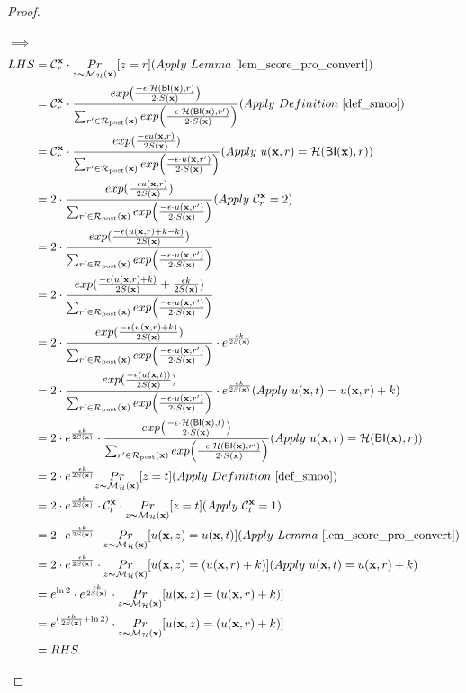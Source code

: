 \documentclass{article}
\begin{document}
\begin{proof}
\begin{itemize}
      $\implies$
      \begin{equation*}
      \begin{split}
      LHS   
      & = \cardinality{\dataobs}{r} \cdot \hexpmechPr{\dataobs}{z = r}     (Apply\ Lemma\ \ref{lem_score_pro_convert})\\
      & = \cardinality{\dataobs}{r} \cdot \frac {exp\big(\frac{-\epsilon\cdot\hellinger(\bysinfer(\dataobs),r)}{2\cdot S(\dataobs)}\big)}{\nomalizer{\dataobs}} 
      (Apply\ Definition\ \ref{def_smoo})\\
      & = \cardinality{\dataobs}{r} \cdot \frac{exp(\frac{-\epsilon \ux{r}}{2 S(\dataobs)})}{\unomalizer{\dataobs}}
      (Apply\ \ux{r} = \hellinger(\bysinfer(\dataobs), r))\\
      & = 2 \cdot \frac{exp(\frac{-\epsilon \ux{r}}{2 S(\dataobs)})}{\unomalizer{\dataobs}}                  (Apply \ \cardinality{\dataobs}{r} = 2)\\
      & = 2 \cdot \frac{exp(\frac{-\epsilon (\ux{r} + k - k)}{2 S(\dataobs)})}{\unomalizer{\dataobs}}\\
      & = 2 \cdot \frac{exp(\frac{-\epsilon (\ux{r} + k)}{2 S(\dataobs)} + \frac{\epsilon k}{2 S(\dataobs)})}{\unomalizer{\dataobs}}\\
      & = 2 \cdot \frac{exp(\frac{-\epsilon (\ux{r} + k)}{2 S(\dataobs)})}{\unomalizer{\dataobs}} \cdot e^{\frac{\epsilon k}{2 S(\dataobs)}}\\
      & = 2 \cdot \frac{exp(\frac{-\epsilon (\ux{t})}{2 S(\dataobs)})}{\unomalizer{\dataobs}} \cdot e^{\frac{\epsilon k}{2 S(\dataobs)}}  (Apply \ \ux{t} = \ux{r} + k)\\
      & = 2 \cdot e^{\frac{\epsilon k}{2 S(\dataobs)}} \cdot \frac {exp\big(\frac{-\epsilon\cdot\hellinger(\bysinfer(\dataobs), t)}{2\cdot S(\dataobs)}\big)}{\nomalizer{\dataobs}} 
      (Apply\ \ux{r} = \hellinger(\bysinfer(\dataobs), r))\\
      & = 2 \cdot e^{\frac{\epsilon k}{2 S(\dataobs)}} \hexpmechPr{\dataobs}{z = t}       (Apply\ Definition\ \ref{def_smoo})\\
      & = 2 \cdot e^{\frac{\epsilon k}{2 S(\dataobs)}} \cdot \cardinality{\dataobs}{t} \cdot \hexpmechPr{\dataobs}{z = t} (Apply\ \cardinality{\dataobs}{t} = 1)\\
      & = 2 \cdot e^{\frac{\epsilon k}{2 S(\dataobs)}} \cdot \hexpmechPr{\dataobs}{\ux{z} = \ux{t}}       (Apply \ Lemma\ \ref{lem_score_pro_convert})\\
      & = 2 \cdot e^{\frac{\epsilon k}{2 S(\dataobs)}} \cdot \hexpmechPr{\dataobs}{\ux{z} = (\ux{r} + k)} (Apply \ \ux{t} = \ux{r} + k)\\
      & = e^{\ln 2} \cdot e^{\frac{\epsilon k}{2 S(\dataobs)}} \cdot \hexpmechPr{\dataobs}{\ux{z} = (\ux{r} + k)}\\
      & = e^{(\frac{\epsilon k}{2 S(\dataobs)} + \ln 2)} \cdot \hexpmechPr{\dataobs}{\ux{z} = (\ux{r} + k)}\\
      & = RHS.
      \end{split}
      \end{equation*} 


\end{itemize}
\end{proof}
\end{document}
